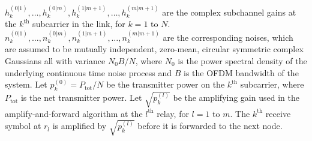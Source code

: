 $h_k^{(0|1)}, \ldots, h_k^{(0|m)}, h_k^{(1|m+1)}, \ldots, h_k^{(m|m+1)}$ are the complex subchannel gains at the $k^{\mbox{th}}$ subcarrier in the link, for $k = 1$ to $N$.   $n_k^{(0|1)}, \ldots, n_k^{(0|m)}, n_k^{(1|m+1)}, \ldots, n_k^{(m|m+1)}$ are the corresponding noises, which are assumed to be mutually independent, zero-mean, circular symmetric complex Gaussians all with variance $N_0 B / N$, where $N_0$ is the power spectral density of the underlying continuous time noise process and $B$ is the OFDM bandwidth of the system.  Let $p_k^{(0)} = P_{\mbox{tot}}/N$ be the transmitter power on the $k^{\mbox{th}}$ subcarrier, where $P_{\mbox{tot}}$ is the net transmitter power.  Let  $\sqrt{p_k^{(l)}}$ be the amplifying gain used in the amplify-and-forward algorithm at the $l^{\mbox{th}}$ relay, for $l=1$ to $m$.  The $k^{\mbox{th}}$ receive symbol at $r_l$ is amplified by $\sqrt{p_k^{(l)}}$ before it is forwarded to the next node.

